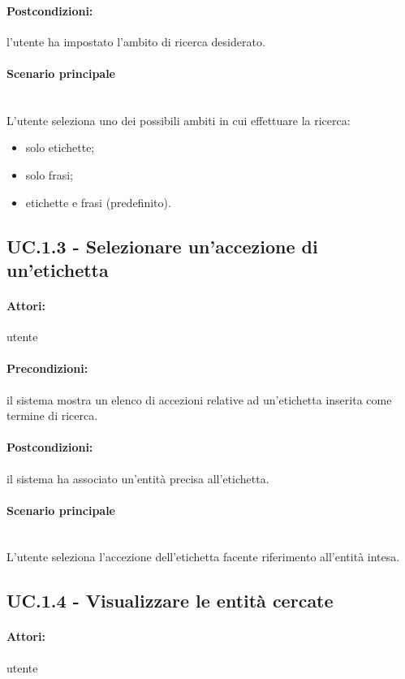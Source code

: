 \documentclass[10pt,a4paper,headinclude,footinclude,hidelinks]{scrreprt} %
\begin{document}
	\paragraph{Postcondizioni:} l'utente ha impostato l'ambito di ricerca desiderato.
	\paragraph{Scenario principale} \hfill \\
	L'utente seleziona uno dei possibili ambiti in cui effettuare la ricerca:
	\begin{itemize}
	\item solo etichette;
	\item solo frasi;
	\item etichette e frasi (predefinito).
	\end{itemize}

	\subsection[UC.1.3]{UC.1.3 - Selezionare un'accezione di un'etichetta}
	\label{sec:stage:ar:uc:1_3}
	\paragraph{Attori:} utente
	\paragraph{Precondizioni:} il sistema mostra un elenco di accezioni relative ad un'etichetta inserita come termine di ricerca.
	\paragraph{Postcondizioni:} il sistema ha associato un'entità precisa all'etichetta.
	\paragraph{Scenario principale}  \hfill \\
	L'utente seleziona l'accezione dell'etichetta facente riferimento all'entità intesa.

	\subsection[UC.1.4]{UC.1.4 - Visualizzare le entità cercate}
	\label{sec:stage:ar:uc:1_4}
	\paragraph{Attori:} utente
\end{document}
